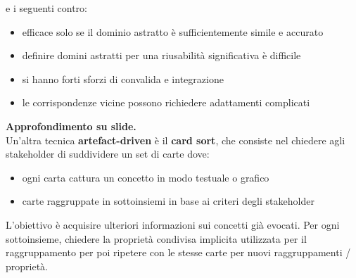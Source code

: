 \documentclass[a4paper,12pt, oneside]{book}
\begin{document}
e i seguenti contro:
\begin{itemize}
  \item efficace solo se il dominio astratto è sufficientemente simile e
  accurato 
  \item definire domini astratti per una riusabilità significativa è difficile 
  \item si hanno forti sforzi di convalida e integrazione 
  \item le corrispondenze vicine possono richiedere adattamenti complicati
\end{itemize}
\textbf{Approfondimento su slide.}\\
Un'altra tecnica \textbf{artefact-driven} è il \textbf{card sort}, che consiste
nel chiedere agli 
stakeholder di suddividere un set di carte dove:
\begin{itemize}
  \item ogni carta cattura un concetto in modo testuale o grafico 
  \item carte raggruppate in sottoinsiemi in base ai criteri degli stakeholder 
\end{itemize}
L'obiettivo è acquisire ulteriori informazioni sui concetti già evocati. Per ogni
sottoinsieme, chiedere la proprietà condivisa implicita utilizzata per il
raggruppamento per poi ripetere con le stesse carte per nuovi raggruppamenti /
proprietà.
\end{document}
